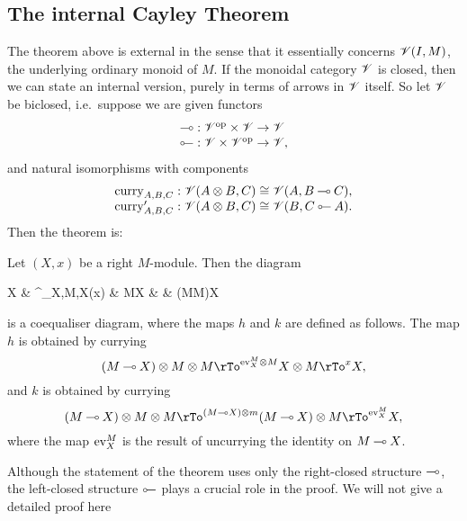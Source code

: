 \documentclass{robinthesisdraft}
\begin{document}
% 
\subsection{The internal Cayley Theorem}
The theorem above is external in the sense that it essentially
concerns $\mathscr{V}(I, M)$, the underlying ordinary monoid of $M$. If
the monoidal category $\mathscr{V}$ is closed, then we can state an
internal version, purely in terms of arrows in $\mathscr{V}$ itself.
%
So let $\mathscr{V}$ be biclosed, i.e.\ suppose we are given
functors
\[\begin{array}{l}
	\lolli: \V\op\times\V\to\V \\
	\illol: \V\times\V\op\to\V,
\end{array}\]
and natural isomorphisms with components
\[\begin{array}{l}
	\curry_{A,B,C}:  \V(A\tn B, C) \cong \V(A, B\lolli C), \\
	\curry'_{A,B,C}: \V(A\tn B, C) \cong \V(B, C\illol A).
\end{array}\]
Then the theorem is:
\begin{thm}\label{thm-1d-internal}
	Let $(X,x)$ be a right $M$-module. Then the diagram
	\begin{diagram}
		X & \rTo^{\curry_{X,M,X}(x)} & M\lolli X & 
		 & (M\tn M)\lolli X
	\end{diagram}
	is a coequaliser diagram, where the maps $h$ and $k$ are defined as
	follows. The map $h$ is obtained by currying
	\[
		(M\lolli X)\tn M\tn M \rTo^{\ev^{M}_{X}\tn M} X\tn M \rTo^{x} X,
	\]
	and $k$ is obtained by currying
	\[
		(M\lolli X)\tn M\tn M \rTo^{(M\lolli X)\tn m} (M\lolli X)\tn M \rTo^{\ev^{M}_{X}} X,
	\]
	where the map $\mathrm{ev}^{M}_{X}$ is the result of uncurrying the identity
	on $M\mathbin{\multimap} X$.
\end{thm}
%
Although the statement of the theorem uses only the right-closed
structure $\mathbin{\multimap}$, the left-closed structure $\illol$ plays a
crucial role in the proof. We will not give a detailed proof here%
\end{document}
